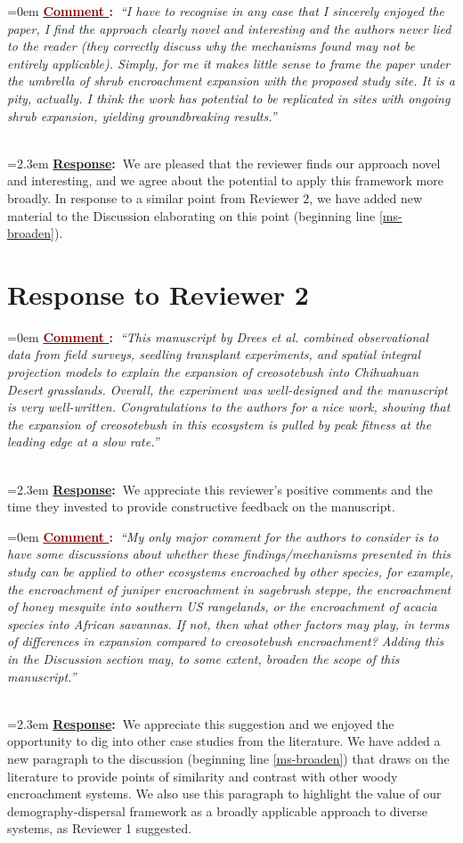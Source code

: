 \documentclass[12pt]{article}
\newcounter{cN}
\newcommand{\comment}[1]{
	\vspace{2em}
	\refstepcounter{cN} %
	\noindent \hangindent=0em \textbf{\textcolor{Maroon}{\uline{Comment \thecN}:~}}\emph{``#1''}
	}
\newcommand{\response}[1]{
	\\[0.25em]
	\hangindent=2.3em \textbf{\textcolor{NavyBlue}{\uline{Response}:~}}#1
	}
\begin{document}
\comment{I have to recognise in any case that I sincerely enjoyed the paper, I find the approach clearly novel and interesting and the authors never lied to the reader (they correctly discuss why the mechanisms found may not be entirely applicable). Simply, for me it makes little sense to frame the paper under the umbrella of shrub encroachment expansion with the proposed study site. It is a pity, actually. I think the work has potential to be replicated in sites with ongoing shrub expansion, yielding groundbreaking results.}
\response{We are pleased that the reviewer finds our approach novel and interesting, and we agree about the potential to apply this framework more broadly. In response to a similar point from Reviewer 2, we have added new material to the Discussion elaborating on this point (beginning line \ref{ms-broaden}).}

\section{Response to Reviewer 2}
\vspace{-2em}

\comment{This manuscript by Drees et al. combined observational data from field surveys, seedling transplant experiments, and spatial integral projection models to explain the expansion of creosotebush into Chihuahuan Desert grasslands. Overall, the experiment was well-designed and the manuscript is very well-written. Congratulations to the authors for a nice work, showing that the expansion of creosotebush in this ecosystem is pulled by peak fitness at the leading edge at a slow rate.}
\response{We appreciate this reviewer's positive comments and the time they invested to provide constructive feedback on the manuscript.}
	
\comment{My only major comment for the authors to consider is to have some discussions about whether these findings/mechanisms presented in this study can be applied to other ecosystems encroached by other species, for example, the encroachment of juniper encroachment in sagebrush steppe, the encroachment of honey mesquite into southern US rangelands, or the encroachment of acacia species into African savannas. If not, then what other factors may play, in terms of differences in expansion compared to creosotebush encroachment? Adding this in the Discussion section may, to some extent, broaden the scope of this manuscript.}
\response{We appreciate this suggestion and we enjoyed the opportunity to dig into other case studies from the literature. We have added a new paragraph to the discussion (beginning line \ref{ms-broaden}) that draws on the literature to provide points of similarity and contrast with other woody encroachment systems. We also use this paragraph to highlight the value of our demography-dispersal framework as a broadly applicable approach to diverse systems, as Reviewer 1 suggested.}
\end{document}
